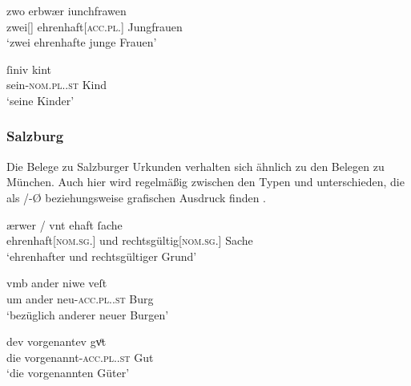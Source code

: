 \begin{exe}
\ex \label{ex:adjmuench}
	\begin{xlist}
	\ex \label{ex:adjmuench_1}
		\gll zwo erbwær iunchfrawen \\
			zwei[\FemF] ehrenhaft[\textsc{acc.pl.\FemF}] Jungfrauen \\
		\trans `zwei ehrenhafte junge Frauen'
			\parencites(Nr.~1024, München, 1288)[348,21]{cao2}

	\ex \label{ex:adjmuench_2}
		\gll ſiniv kint \\
			sein-\textsc{nom.pl.\NeutA.st} Kind \\
		\trans `seine Kinder'
			\parencites(Nr.~2371, München, 1296)[473,9]{cao3}
	\end{xlist}
\end{exe}

\subsubsection{Salzburg}
\label{par:adjsalzburg}
Die Belege zu Salzburger Urkunden verhalten sich ähnlich zu den Belegen zu
München. Auch hier wird regelmäßig zwischen den Typen  und
 unterschieden, die als /-Ø beziehungsweise 
grafischen Ausdruck finden .

\begin{exe}
\ex \label{ex:adjsalzbg}
	\begin{xlist}
	\ex \label{ex:adjsalzbg_1}
		\gll ærwer / vnt ehaft ſache \\
			ehrenhaft[\textsc{nom.sg.\FemI}] {} und rechtsgültig[\textsc{nom.sg.\FemI}]
				Sache \\
		\trans `ehrenhafter und rechtsgültiger Grund'
			\parencites(Nr.~818, Bad Reichenhall, Kr.~Berchtesgadener Land, 1286)[177,1--2]{cao2}

	\ex \label{ex:adjsalzbg_2}
		\gll vmb ander niwe veſt \\
			um ander neu-\textsc{acc.pl.\FemI.st} Burg \\
		\trans `bezüglich anderer neuer Burgen'
			\parencites(Nr.~695, Salzburg, um 1285)[104,19]{cao2}

	\ex \label{ex:adjsalzbg_3}
		\gll dev vorgenantev gvͦt \\
			die vorgenannt-\textsc{acc.pl.\FemI.st} Gut \\
		\trans `die vorgenannten Güter'
			\parencites(Nr.~2446, Salzburg, 1296)[514,11--12]{cao3}
	\end{xlist}
\end{exe}

